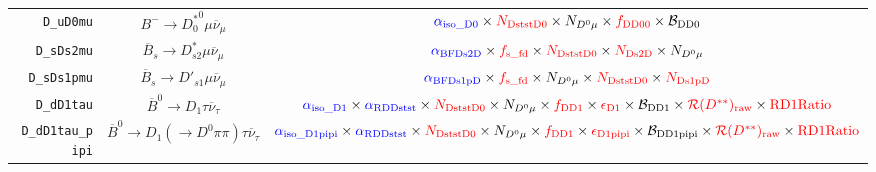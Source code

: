 \begin{landscape}
\begin{table}
\begin{tabular}{r|c|c}
        \texttt{D\_uD0mu} &                  $B^- \rightarrow {D^*_0}^0 \mu \overline{\nu}_\mu$                  &                                                                                                   $\textcolor{blue}{\alpha_\text{iso\_D0}} \times \textcolor{red}{N_\text{DststD0}} \times N_{D^0 \mu} \times \textcolor{red}{f_\text{DD00}} \times \mathcal{B}_\text{DD0}$                                                                                                   \\
       \texttt{D\_sDs2mu} &             $\overline{B}_s \rightarrow D_{s2}^* \mu \overline{\nu}_\mu$             &                                                                                               $\textcolor{blue}{\alpha_\text{BFDs2D}} \times \textcolor{red}{f_\text{s\_fd}} \times \textcolor{red}{N_\text{DststD0}} \times \textcolor{red}{N_\text{Ds2D}} \times N_{D^0 \mu}$                                                                                               \\
      \texttt{D\_sDs1pmu} &             $\overline{B}_s \rightarrow D'_{s1} \mu \overline{\nu}_\mu$              &                                                                                              $\textcolor{blue}{\alpha_\text{BFDs1pD}} \times \textcolor{red}{f_\text{s\_fd}} \times N_{D^0 \mu} \times \textcolor{red}{N_\text{DststD0}} \times \textcolor{red}{N_\text{Ds1pD}}$                                                                                              \\
       \texttt{D\_dD1tau} &              $\overline{B}^0 \rightarrow D_1 \tau \overline{\nu}_\tau$               &       $\textcolor{blue}{\alpha_\text{iso\_D1}} \times \textcolor{blue}{\alpha_\text{RDDstst}} \times \textcolor{red}{N_\text{DststD0}} \times N_{D^0 \mu} \times \textcolor{red}{f_\text{DD1}} \times \textcolor{red}{\epsilon_\text{D1}} \times \mathcal{B}_\text{DD1} \times \textcolor{red}{\mathcal{R}(D^{**})_\text{raw}} \times \textcolor{red}{\text{RD1Ratio}}$       \\
 \texttt{D\_dD1tau\_pipi} &  $\overline{B}^0 \rightarrow D_1 (\rightarrow D^0 \pi\pi) \tau \overline{\nu}_\tau$  & $\textcolor{blue}{\alpha_\text{iso\_D1pipi}} \times \textcolor{blue}{\alpha_\text{RDDstst}} \times \textcolor{red}{N_\text{DststD0}} \times N_{D^0 \mu} \times \textcolor{red}{f_\text{DD1}} \times \textcolor{red}{\epsilon_\text{D1pipi}} \times \mathcal{B}_\text{DD1pipi} \times \textcolor{red}{\mathcal{R}(D^{**})_\text{raw}} \times \textcolor{red}{\text{RD1Ratio}}$ \\

\end{tabular}
\end{table}
\end{landscape}
